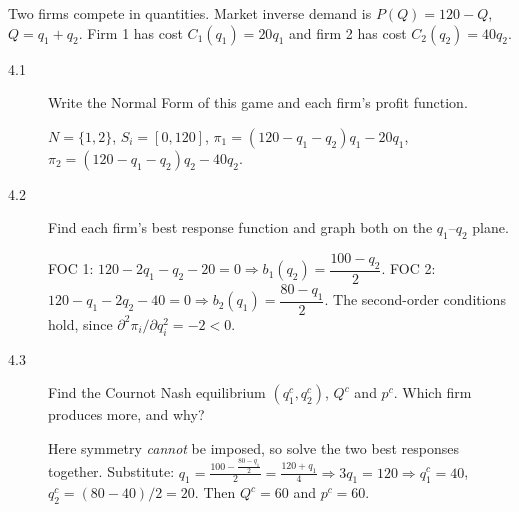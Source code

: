 \noindent Two firms compete in quantities. Market inverse demand is $P(Q)=120-Q$, $Q=q_1+q_2$. Firm 1 has cost $C_1(q_1)=20q_1$ and firm 2 has cost $C_2(q_2)=40q_2$.

\begin{description}
\item[4.1] Write the Normal Form of this game and each firm's profit function.
\begin{solution}
$N=\{1,2\}$, $S_i=[0,120]$, $\pi_1=(120-q_1-q_2)q_1-20q_1$, $\pi_2=(120-q_1-q_2)q_2-40q_2$.
\end{solution}
\item[4.2] Find each firm's best response function and graph both on the $q_1$--$q_2$ plane.
\begin{solution}
FOC 1: $120-2q_1-q_2-20=0\Rightarrow b_1(q_2)=\dfrac{100-q_2}{2}$. FOC 2: $120-q_1-2q_2-40=0\Rightarrow b_2(q_1)=\dfrac{80-q_1}{2}$. The second-order conditions hold, since $\partial^2\pi_i/\partial q_i^2=-2<0$.
\begin{center}
\end{center}
\end{solution}
\item[4.3] Find the Cournot Nash equilibrium $(q_1^c,q_2^c)$, $Q^c$ and $p^c$. Which firm produces more, and why?
\begin{solution}
Here symmetry \emph{cannot} be imposed, so solve the two best responses together. Substitute: $q_1=\frac{100-\frac{80-q_1}{2}}{2}=\frac{120+q_1}{4}\Rightarrow3q_1=120\Rightarrow q_1^c=40$, $q_2^c=(80-40)/2=20$. Then $Q^c=60$ and $p^c=60$.


\end{solution}
\end{description}
